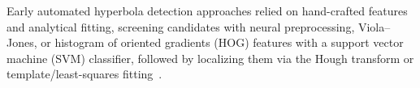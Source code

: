 \documentclass[lettersize,journal]{IEEEtran}
\begin{document}


Early automated hyperbola detection approaches relied on hand-crafted features and analytical fitting, 
screening candidates with neural preprocessing, Viola--Jones,
or histogram of oriented gradients (HOG) features with a support vector machine (SVM) classifier, followed by localizing them via the Hough transform or template/least-squares
fitting~\cite{alnuaimy2000nn,Maas2013Using,lee2014hog,Sagnard2016Template-matching}. 
\end{document}
